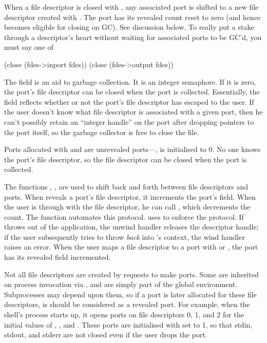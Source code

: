 When a file descriptor is closed with , any associated
port is shifted to a new file descriptor created with .
The port has its revealed count reset to zero (and hence becomes eligible
for closing on GC). See discussion below.
To really put a stake through a descriptor's heart without waiting for
associated ports to be GC'd, you must say one of
%
\begin{code}
(close (fdes->inport fdes))
(close (fdes->output fdes))\end{code}

The  field is an aid to garbage collection. It is an integer
semaphore. If it is zero, the port's file descriptor can be closed when
the port is collected. Essentially, the  field reflects whether
or not the port's file descriptor has escaped to the {\Scheme} user. If
the {\Scheme} user doesn't know what file descriptor is associated with
a given port, then he can't possibly retain an ``integer handle'' on the
port after dropping pointers to the port itself, so the garbage collector
is free to close the file.

Ports allocated with  and  are
unrevealed ports---\ie,  is initialised to 0.
No one knows the port's file descriptor, so the file descriptor can be closed
when the port is collected.

The functions , , 
are used to shift back and forth between file descriptors and ports.  When
 reveals a port's file descriptor, it increments the port's
 field.  When the user is through with the file descriptor, he
can call , which decrements the count. 
The function  automates this protocol.
 uses  to enforce the protocol.  
If  throws out of the  application,
the unwind handler releases the descriptor handle;
if the user subsequently tries to throw \emph{back} into 's
context, the wind handler raises an error. When the user maps a file
descriptor to a port with  or , the port
has its revealed field incremented.

Not all file descriptors are created by requests to make ports.  Some are
inherited on process invocation via , and are simply part of the
global environment. Subprocesses may depend upon them, so if a port is later
allocated for these file descriptors, is should be considered as a revealed
port. For example, when the {\Scheme} shell's process starts up, it opens ports
on file descriptors 0, 1, and 2 for the initial values of
, , and
. 
These ports are initialised with  set to 1,
so that stdin, stdout, and stderr are not closed even if the user drops the
port.  

